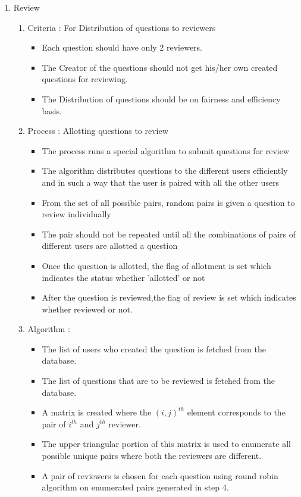 \documentclass[a4paper,12pt,oneside]{book}
\begin{document}
\begin{enumerate}
        \item Review
            \begin{enumerate}
                \item Criteria : For Distribution of questions to reviewers
                \begin{itemize}
                    \item Each question should have only 2 reviewers.
                    \item  The Creator of the questions should not get his/her own created questions for reviewing.
                    \item  The Distribution of questions should be on fairness and efficiency basis.
                \end{itemize}
            \item Process : Allotting questions to review
                \begin{itemize}
                    \item  The process runs a special algorithm to submit questions for review 
                    \item  The algorithm distributes questions to the different users efficiently and in such a way that the user is paired with all the other users
                    \item  From the set of all possible pairs, random pairs is given a question to review individually
                    \item The pair should not be repeated until all the combinations of pairs of different users are allotted a question
                    \item Once the question is allotted, the flag of allotment is set which indicates the status whether 'allotted' or not
                    \item After the question is reviewed,the flag of review is set which indicates whether reviewed or not.
                \end{itemize}
            \item Algorithm :
                \begin{itemize}
                   \item The list of users who created the question is fetched from the database.
                	\item The list of questions that are to be reviewed is fetched from the database.
                	\item A matrix is created where the $(i, j)^{th}$ element corresponds to the pair of $i^{th}$ and $j^{th}$ reviewer.
                	\item The upper triangular portion of this matrix is used to enumerate all possible unique pairs where both the reviewers are different.
                	\item A pair of reviewers is chosen for each question using round robin algorithm on enumerated pairs generated in step 4.
	

\end{itemize}
\end{enumerate}
\end{enumerate}
\end{document}
